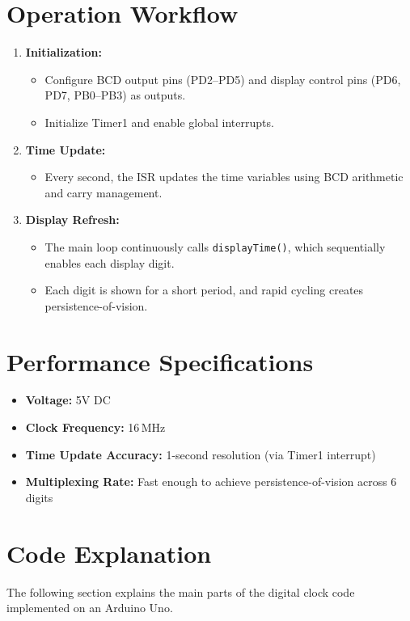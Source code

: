 \documentclass{article}
\theoremstyle{remark}
\begin{document}
\section{Operation Workflow}
\begin{enumerate}
    \item \textbf{Initialization:}
    \begin{itemize}[noitemsep]
        \item Configure BCD output pins (PD2--PD5) and display control pins (PD6, PD7, PB0--PB3) as outputs.
        \item Initialize Timer1 and enable global interrupts.
    \end{itemize}
    \item \textbf{Time Update:}
    \begin{itemize}[noitemsep]
        \item Every second, the ISR updates the time variables using BCD arithmetic and carry management.
    \end{itemize}
    \item \textbf{Display Refresh:}
    \begin{itemize}[noitemsep]
        \item The main loop continuously calls \texttt{displayTime()}, which sequentially enables each display digit.
        \item Each digit is shown for a short period, and rapid cycling creates persistence-of-vision.
    \end{itemize}
\end{enumerate}

\section{Performance Specifications}
\begin{itemize}[noitemsep]
    \item \textbf{Voltage:} 5V DC
    \item \textbf{Clock Frequency:} 16\,MHz
    \item \textbf{Time Update Accuracy:} 1-second resolution (via Timer1 interrupt)
    \item \textbf{Multiplexing Rate:} Fast enough to achieve persistence-of-vision across 6 digits
\end{itemize}

\section{Code Explanation}
The following section explains the main parts of the digital clock code implemented on an Arduino Uno.
\end{document}
